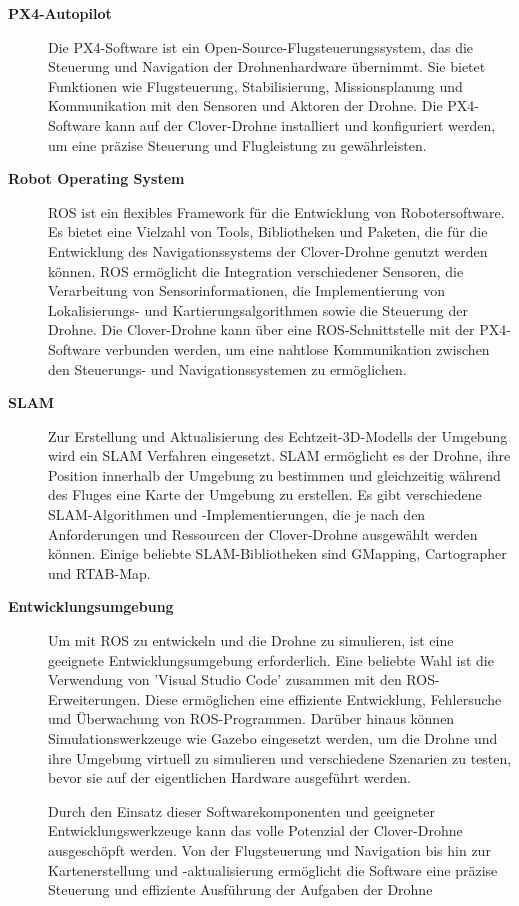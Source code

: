 \begin{description}
    \item[\textbf{PX4-Autopilot}] Die PX4-Software ist ein Open-Source-Flugsteuerungssystem, das die Steuerung und Navigation der Drohnenhardware übernimmt. Sie bietet Funktionen wie Flugsteuerung, Stabilisierung, Missionsplanung und Kommunikation mit den Sensoren und Aktoren der Drohne. Die PX4-Software kann auf der Clover-Drohne installiert und konfiguriert werden, um eine präzise Steuerung und Flugleistung zu gewährleisten.
    
    \item[\textbf{Robot Operating System}] ROS ist ein flexibles Framework für die Entwicklung von Robotersoftware. Es bietet eine Vielzahl von Tools, Bibliotheken und Paketen, die für die Entwicklung des Navigationssystems der Clover-Drohne genutzt werden können. ROS ermöglicht die Integration verschiedener Sensoren, die Verarbeitung von Sensorinformationen, die Implementierung von Lokalisierungs- und Kartierungsalgorithmen sowie die Steuerung der Drohne. Die Clover-Drohne kann über eine ROS-Schnittstelle mit der PX4-Software verbunden werden, um eine nahtlose Kommunikation zwischen den Steuerungs- und Navigationssystemen zu ermöglichen.
    \item[\textbf{\ac{SLAM}}] Zur Erstellung und Aktualisierung des Echtzeit-3D-Modells der Umgebung wird ein \ac{SLAM} Verfahren eingesetzt. \ac{SLAM} ermöglicht es der Drohne, ihre Position innerhalb der Umgebung zu bestimmen und gleichzeitig während des Fluges eine Karte der Umgebung zu erstellen. Es gibt verschiedene \ac{SLAM}-Algorithmen und -Implementierungen, die je nach den Anforderungen und Ressourcen der Clover-Drohne ausgewählt werden können. Einige beliebte \ac{SLAM}-Bibliotheken sind GMapping, Cartographer und RTAB-Map.
    
    \item[\textbf{Entwicklungsumgebung}]  Um mit ROS zu entwickeln und die Drohne zu simulieren, ist eine geeignete Entwicklungsumgebung erforderlich. Eine beliebte Wahl ist die Verwendung von 'Visual Studio Code' zusammen mit den ROS-Erweiterungen. Diese ermöglichen eine effiziente Entwicklung, Fehlersuche und Überwachung von ROS-Programmen. Darüber hinaus können Simulationswerkzeuge wie Gazebo eingesetzt werden, um die Drohne und ihre Umgebung virtuell zu simulieren und verschiedene Szenarien zu testen, bevor sie auf der eigentlichen Hardware ausgeführt werden.

    Durch den Einsatz dieser Softwarekomponenten und geeigneter Entwicklungswerkzeuge kann das volle Potenzial der Clover-Drohne ausgeschöpft werden. Von der Flugsteuerung und Navigation bis hin zur Kartenerstellung und -aktualisierung ermöglicht die Software eine präzise Steuerung und effiziente Ausführung der Aufgaben der Drohne
     
\end{description}

